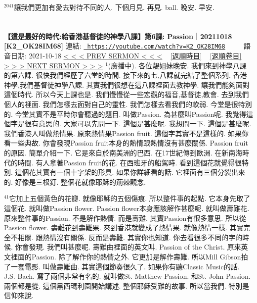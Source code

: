 \documentclass{book}
\begin{document}
$^{2041}$讓我們更加有愛去對待不同的人.
下個月見.
再見.
ball.
晚安.
早安.
\newpage



\section{}
\label{sec:K2_OK28IM68}
\textbf{【這是最好的時代:給香港基督徒的神學八課】第6課: Passion｜20211018 [K2\_OK28IM68]}
\newline
\newline
連結: \href{https://youtube.com/watch?v=K2_OK28IM68}{\texttt{ https://youtube.com/watch?v=K2\_OK28IM68}} ~~~~ 語音日期: 2021-10-18 
\newline
\newline
\hyperref[sec:xbbmUvNItM8]{\small{< < < PREV SERMON < < <}}
~
\hyperref[sec:index_chronic]{\small{[返順時目]}}
~
\hyperref[sec:index_scriptual]{\small{[返順卷目]}}
~
\hyperref[sec:S_0UcgQqbRI]{\small{> > > NEXT SERMON > > >}}
\newline
\newline
$^{1}$(廣播中).
各位靚姐妹晚安.
我們來到神學八課的第六課.
很快我們經歷了六堂的時間.
接下來的七,八課就完結了整個系列.
香港神學,我們基督徒神學八課.
其實我們很想在這八課裡面去教神學.
讓我們能夠面對這個時代.
所以今天上課也是.
我們慢慢從一些宏觀的福音,基督徒,教會.
去到我們個人的裡面.
我們怎樣去面對自己的靈性.
我們怎樣去看我們的軟弱.
今堂是很特別的.
今堂其實不是平時你會聽過的題目.
叫做Passion.
為甚麼叫Passion呢.
我覺得這個字是很有意思的.
大家可以先問一下.
這個是甚麼呢.
我想問一下.
這個是甚麼呢.
我們香港人叫做熱情果.
原來熱情果Passion fruit.
這個字其實不是這樣的.
如果你看一些典故.
你會發現Passion fruit本身的熱情跟熱情沒有甚麼關係.
Passion fruit的原因.
簡單介紹一下.
它是來自於南美洲的巴西.
在17世紀傳到歐洲.
在新南海時代的時間.
有人拿著Passion fruit的花.
在西班牙的船駕時.
看到這個花就覺得很特別.
這個花其實有一個十字架的形具.
如果你詳細看的話.
它裡面有三個分裂出來的.
好像是三根釘.
整個花就像耶穌的荊棘觀念.

$^{41}$它加上五個黃色的花瓣.
就像耶穌的五個傷痕.
所以整件事的起點.
它本身先取了這個花.
就叫做Passion flower.
Passion flower本身應該解作甚麼呢.
就叫做壽難花.
原來整件事的Passion.
不是解作熱情.
而是壽難.
其實Passion有很多意思.
所以從Passion flower.
壽難花到壽難果.
來到香港就變成了熱情果.
就像熱情一樣.
其實完全不相關.
跟熱情沒有關係.
反而是壽難.
其實你也知道.
你去看很多不同的字的時候.
你會發現.
我們叫甚麼呢.
壽難曲裡面的英文叫.
Passion of the Christ.
原來英文裡面的Passion.
除了解作你的熱情之外.
它更加是解作壽難.
所以Mill Gibson拍了一套電影.
叫做壽難曲.
其實這個節奏很久了.
如果你有聽Classic Music的話.
J.S. Bach.
寫了兩個非常有名的.
就叫做St. Matthew Passion.
和St. John Passion.
兩個都是從.
這個黑西瑪利園開始講述.
整個耶穌受難的故事.
所以當我們.
特別是信仰來說.
\end{document}
